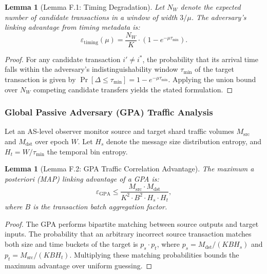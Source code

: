 \documentclass[journal,10pt,twocolumn]{IEEEtran}
\newtheorem{lemma}[theorem]{Lemma}
\theoremstyle{definition}
\theoremstyle{remark}
\begin{document}
\begin{lemma}[Lemma F.1: Timing Degradation]\label{lem:timing}
Let $N_W$ denote the expected number of candidate transactions in a window of width $3/\mu$. The adversary's linking advantage from timing metadata is:
\begin{equation}
\varepsilon_{\text{timing}}(\mu) = \frac{N_W}{K} \cdot (1 - e^{-\mu \tau_{\min}}).
\end{equation}
\end{lemma}

\begin{proof}
For any candidate transaction $i' \neq i^*$, the probability that its arrival time falls within the adversary's indistinguishability window $\tau_{\min}$ of the target transaction is given by $\Pr[\Delta \le \tau_{\min}] = 1 - e^{-\mu \tau_{\min}}$. Applying the union bound over $N_W$ competing candidate transfers yields the stated formulation.
\end{proof}

\subsubsection{Global Passive Adversary (GPA) Traffic Analysis}
Let an AS-level observer monitor source and target shard traffic volumes $M_{\text{src}}$ and $M_{\text{dst}}$ over epoch $W$. Let $H_s$ denote the message size distribution entropy, and $H_t = W/\tau_{\min}$ the temporal bin entropy.

\begin{lemma}[Lemma F.2: GPA Traffic Correlation Advantage]\label{lem:gpa}
The maximum a posteriori (MAP) linking advantage of a GPA is:
\begin{equation}
\varepsilon_{\text{GPA}} \le \frac{M_{\text{src}} \cdot M_{\text{dst}}}{K^2 \cdot B^2 \cdot H_s \cdot H_t},
\end{equation}
where $B$ is the transaction batch aggregation factor.
\end{lemma}

\begin{proof}
The GPA performs bipartite matching between source outputs and target inputs. The probability that an arbitrary incorrect source transaction matches both size and time buckets of the target is $p_s \cdot p_t$, where $p_s = M_{\text{dst}} / (K B H_s)$ and $p_t = M_{\text{src}} / (K B H_t)$. Multiplying these matching probabilities bounds the maximum advantage over uniform guessing.
\end{proof}
\end{document}
